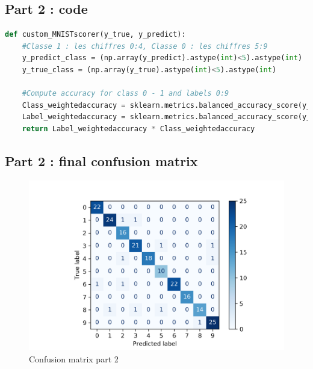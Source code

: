 \subsection{Part 2 : code}
\label{appendix:code_part2}
\begin{lstlisting}[language=Python]
def custom_MNISTscorer(y_true, y_predict):
    #Classe 1 : les chiffres 0:4, Classe 0 : les chiffres 5:9
    y_predict_class = (np.array(y_predict).astype(int)<5).astype(int)
    y_true_class = (np.array(y_true).astype(int)<5).astype(int)
    
    #Compute accuracy for class 0 - 1 and labels 0:9
    Class_weightedaccuracy = sklearn.metrics.balanced_accuracy_score(y_true_class, y_predict_class)
    Label_weightedaccuracy = sklearn.metrics.balanced_accuracy_score(y_true, y_predict)
    return Label_weightedaccuracy * Class_weightedaccuracy
\end{lstlisting}

\subsection{Part 2 : final confusion matrix}
\begin{figure}[h]
	\centering 
	\includegraphics[scale=0.7]{Pics/part2confusion_mat}
	\caption{Confusion matrix part 2}
	\label{fig:confusion}
\end{figure} 